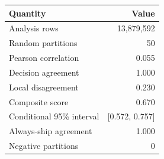 \begin{tabular}{lr}
\toprule
Quantity & Value \\
\midrule
Analysis rows & 13,879,592 \\
Random partitions & 50 \\
Pearson correlation & 0.055 \\
Decision agreement & 1.000 \\
Local disagreement & 0.230 \\
Composite score & 0.670 \\
Conditional 95\% interval & [0.572, 0.757] \\
Always-ship agreement & 1.000 \\
Negative partitions & 0 \\
\bottomrule
\end{tabular}
